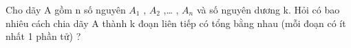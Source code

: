 Cho dãy A gồm n số nguyên $A_{1}$   , $A_{2}$   ,… , $A_{n}$   và số nguyên dương k. Hỏi có bao nhiêu cách chia dãy A thành k đoạn liên tiếp có tổng bằng nhau (mỗi đoạn có ít nhất 1 phần tử) ?